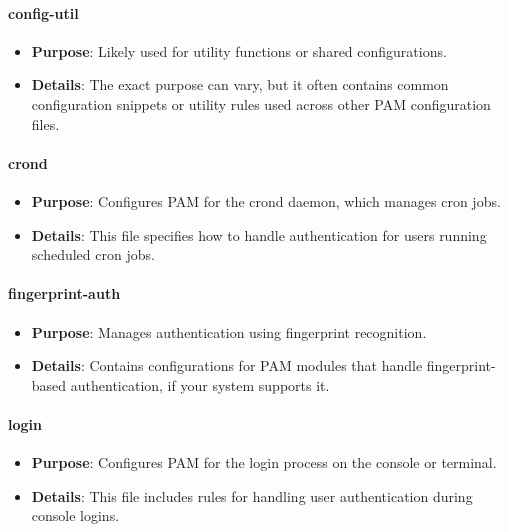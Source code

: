 \documentclass{article}
\begin{document}
\paragraph{config-util}

\begin{itemize}
    \item \textbf{Purpose}: Likely used for utility functions or shared configurations.
    \item \textbf{Details}: The exact purpose can vary, but it often contains common configuration snippets or utility rules used across other PAM configuration files.
\end{itemize}

\paragraph{crond}

\begin{itemize}
    \item \textbf{Purpose}: Configures PAM for the crond daemon, which manages cron jobs.
    \item \textbf{Details}: This file specifies how to handle authentication for users running scheduled cron jobs.
\end{itemize}

\paragraph{fingerprint-auth}

\begin{itemize}
    \item \textbf{Purpose}: Manages authentication using fingerprint recognition.
    \item \textbf{Details}: Contains configurations for PAM modules that handle fingerprint-based authentication, if your system supports it.
\end{itemize}

\paragraph{login}

\begin{itemize}
    \item \textbf{Purpose}: Configures PAM for the login process on the console or terminal.
    \item \textbf{Details}: This file includes rules for handling user authentication during console logins.
\end{itemize}
\end{document}
